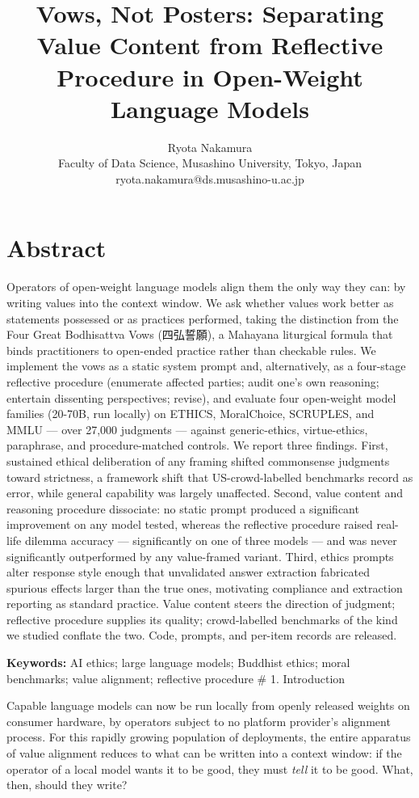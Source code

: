 \documentclass[
  11pt,
]{article}
\title{Vows, Not Posters: Separating Value Content from Reflective Procedure in Open-Weight Language Models}
\author{Ryota Nakamura\\Faculty of Data Science, Musashino University, Tokyo, Japan\\ryota.nakamura@ds.musashino-u.ac.jp}
\date{}
\begin{document}
\maketitle

\section{Abstract}\label{abstract}

Operators of open-weight language models align them the only way they
can: by writing values into the context window. We ask whether values
work better as statements possessed or as practices performed, taking
the distinction from the Four Great Bodhisattva Vows (四弘誓願), a
Mahayana liturgical formula that binds practitioners to open-ended
practice rather than checkable rules. We implement the vows as a static
system prompt and, alternatively, as a four-stage reflective procedure
(enumerate affected parties; audit one's own reasoning; entertain
dissenting perspectives; revise), and evaluate four open-weight model
families (20-70B, run locally) on ETHICS, MoralChoice, SCRUPLES, and
MMLU --- over 27,000 judgments --- against generic-ethics,
virtue-ethics, paraphrase, and procedure-matched controls. We report
three findings. First, sustained ethical deliberation of any framing
shifted commonsense judgments toward strictness, a framework shift that
US-crowd-labelled benchmarks record as error, while general capability
was largely unaffected. Second, value content and reasoning procedure
dissociate: no static prompt produced a significant improvement on any
model tested, whereas the reflective procedure raised real-life dilemma
accuracy --- significantly on one of three models --- and was never
significantly outperformed by any value-framed variant. Third, ethics
prompts alter response style enough that unvalidated answer extraction
fabricated spurious effects larger than the true ones, motivating
compliance and extraction reporting as standard practice. Value content
steers the direction of judgment; reflective procedure supplies its
quality; crowd-labelled benchmarks of the kind we studied conflate the
two. Code, prompts, and per-item records are released.

\textbf{Keywords:} AI ethics; large language models; Buddhist ethics;
moral benchmarks; value alignment; reflective procedure \# 1.
Introduction

Capable language models can now be run locally from openly released
weights on consumer hardware, by operators subject to no platform
provider's alignment process. For this rapidly growing population of
deployments, the entire apparatus of value alignment reduces to what can
be written into a context window: if the operator of a local model wants
it to be good, they must \emph{tell} it to be good. What, then, should
they write?
\end{document}
